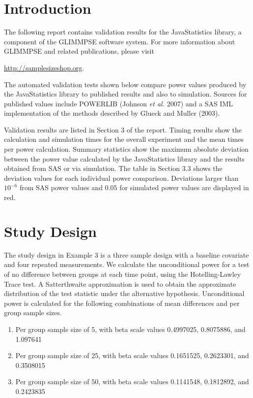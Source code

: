 \documentclass{glimmpse-report}
\begin{document}
\section{Introduction}
The following report contains validation results for the JavaStatistics library, a component of the GLIMMPSE software system.  For more information about GLIMMPSE and related publications, please visit

 

\href{http://samplesizeshop.org}{http://samplesizeshop.org}.

The automated validation tests shown below compare power values produced by the JavaStatistics library to published results and also to simulation.  Sources for published values include POWERLIB (Johnson \emph{et al.} 2007) and a SAS IML implementation of the methods described by Glueck and Muller (2003).

Validation results are listed in Section 3 of the report.  Timing results show the calculation and simulation times for the overall experiment and the mean times per power calculation.  Summary statistics show the maximum absolute deviation between the power value calculated by the JavaStatistics library and the results obtained from SAS or via simulation.  The table in Section 3.3 shows the deviation values for each individual power comparison.  Deviations larger than $10^{-6}$ from SAS power values and $0.05$ for simulated power values are displayed in red.

 \section{Study Design}
The study design in Example 3 is a three sample design with a baseline covariate and four repeated measurements.  We calculate the unconditional power for a test of no difference between groups at each time point, using the Hotelling-Lawley Trace test.  A Satterthwaite approximation is used to obtain the approximate distribution of the test statistic under the alternative hypothesis.  Unconditional power is calculated for the following combinations of mean differences and per group sample sizes.

\begin{enumerate}\item Per group sample size of 5, with beta scale values 0.4997025, 0.8075886, and 1.097641\item Per group sample size of 25, with beta scale values 0.1651525, 0.2623301, and 0.3508015\item Per group sample size of 50, with beta scale values 0.1141548,  0.1812892, and  0.2423835
\end{enumerate}
\end{document}
